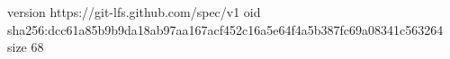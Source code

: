 version https://git-lfs.github.com/spec/v1
oid sha256:dcc61a85b9b9da18ab97aa167acf452c16a5e64f4a5b387fc69a08341c563264
size 68
